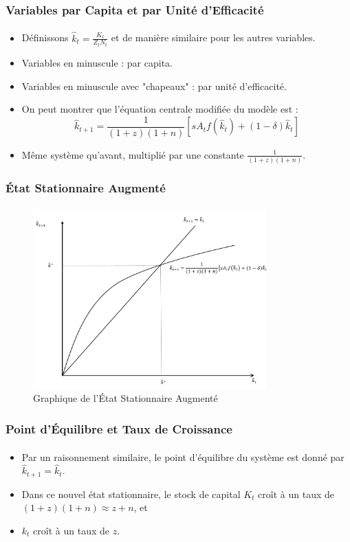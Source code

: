 \documentclass{beamer}
\begin{document}
\begin{frame}
    \frametitle{Variables par Capita et par Unité d'Efficacité}
    \framesubtitle{}

    \begin{itemize}
        \item Définissons \( \hat{k}_t = \frac{K_t}{Z_t N_t} \) et de manière similaire pour les autres variables.
        \pause
        \item Variables en minuscule : par capita.\pause
        \item Variables en minuscule avec "chapeaux" : par unité d'efficacité.\pause
        \item On peut montrer que l'équation centrale modifiée du modèle est :
        \[
        \hat{k}_{t+1} = \frac{1}{(1 + z)(1 + n)} \left[ s A_t f(\hat{k}_t) + (1 - \delta) \hat{k}_t \right]
        \]
        \item Même système qu'avant, multiplié par une constante \( \frac{1}{(1 + z)(1 + n)} \).
    \end{itemize}
\end{frame}

\begin{frame}
    \frametitle{État Stationnaire Augmenté}
    \framesubtitle{}

    \begin{figure}
        \centering
        \includegraphics[width=0.8\textwidth]{graphs/ss_solow_s3.png} %
        \caption{Graphique de l'État Stationnaire Augmenté}
    \end{figure}
\end{frame}

\begin{frame}
    \frametitle{Point d'Équilibre et Taux de Croissance}
    \framesubtitle{}

    \begin{itemize}
        \item Par un raisonnement similaire, le point d'équilibre du système est donné par \( \hat{k}_{t+1} = \hat{k}_t \).
        \item Dans ce nouvel état stationnaire, le stock de capital \( K_t \) croît à un taux de \((1+z)(1+n) \approx z + n\), et
        \item \( k_t \) croît à un taux de \( z \).
    \end{itemize}
\end{frame}
\end{document}
